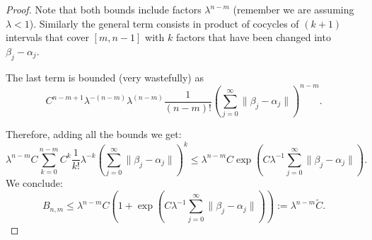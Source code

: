 \documentclass[10pt,a4paper]{amsart}
\begin{document}
\begin{proof}
  Note that both bounds include factors $\lambda^{n -m}$
  (remember we are assuming $\lambda <  1$).
  Similarly the general term  consists in product of cocycles of
  $(k+1)$ intervals that cover  $[m,n-1]$ with $k$ factors that have
  been changed into $\beta_j - \alpha_j$.


  The last term is  bounded (very wastefully)  as
  \[
  C^{n-m+1} \lambda^{-(n-m)} \lambda^{(n-m)} \frac{1}{(n-m)!}
  \left( \sum_{j=0}^{\infty} \| \beta_j - \alpha_j\| \right)^{n-m}.
  \]

  Therefore, adding all the bounds we get:
  \[
  \lambda^{n-m} C \sum_{k = 0}^{n-m} C^k \frac{1}{k!} \lambda^{-k}
  \left( \sum_{j=0}^{\infty} \| \beta_j - \alpha_j\| \right)^{k}
  \le \lambda^{n-m} C \exp\left( C \lambda^{-1} \sum_{j=0}^{\infty} \| \beta_j - \alpha_j\| \right).
  \]
 We conclude:
 \[B_{n,m}\le  \lambda^{n-m} C\left(1+\exp\left( C \lambda^{-1} \sum_{j=0}^{\infty} \| \beta_j - \alpha_j\|\right )\right):=\lambda^{n-m}\tilde{C}.\]

\end{proof}
\end{document}
